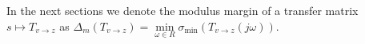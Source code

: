 

In the next sections we denote the modulus margin of a transfer matrix $s \mapsto T_{v \rightarrow z}$ as $\Delta_m(T_{v \rightarrow z}) = \min\limits_{\omega\in R} \sigma_{\min}(T_{v \rightarrow z}(j\omega))$.

